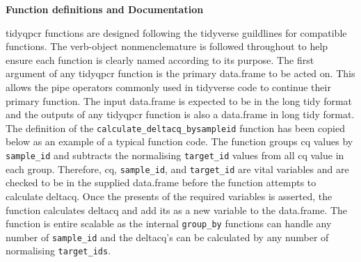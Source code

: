 \documentclass{SBCbookchapter}
\begin{document}
\textbf{Function definitions and Documentation}

tidyqpcr functions are designed following the tidyverse guildlines for compatible functions. The verb-object nonmenclemature is followed throughout to help ensure each function is clearly named according to its purpose. The first argument of any tidyqpcr function is the primary data.frame to be acted on. This allows the pipe operators commonly used in tidyverse code to continue their primary function. The input data.frame is expected to be in the long tidy format and the outputs of any tidyqpcr function is also a data.frame in long tidy format. The definition of the \lstinline{calculate_deltacq_bysampleid} function has been copied below as an example of a typical function code. The function groups cq values by \lstinline{sample_id} and subtracts the normalising \lstinline{target_id} values from all cq value in each group. Therefore, cq, \lstinline{sample_id}, and \lstinline{target_id} are vital variables and are checked to be in the supplied data.frame before the function attempts to calculate deltacq. Once the presents of the required variables is asserted, the function calculates deltacq and add its as a new variable to the data.frame. The function is entire scalable as the internal \lstinline{group_by} functions can handle any number of \lstinline{sample_id} and the deltacq's can be calculated by any number of normalising \lstinline{target_ids}.
\end{document}

